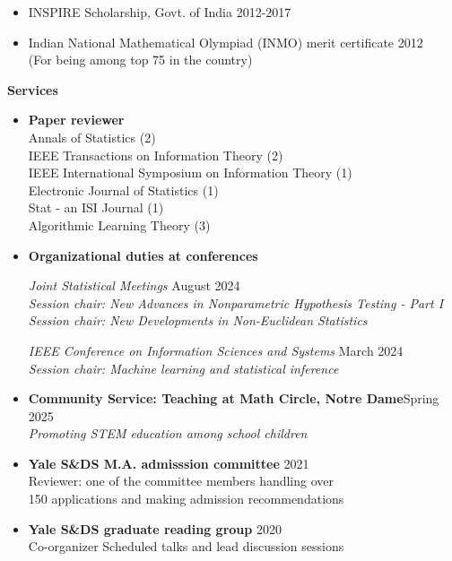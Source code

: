 \documentclass[letterpaper,12pt,oneside]{article}
\theoremstyle{definition}
\begin{document}
			\begin{itemize}
				\item [] INSPIRE Scholarship, Govt. of India \hfill 2012-2017
				\item [] Indian National Mathematical Olympiad (INMO) merit certificate \hfill 2012\\
				(For being among top 75 in the country)
			\end{itemize}
			
			
			\noindent \textbf{Services}
			\begin{itemize}
				\item[]
				{\bf Paper reviewer}\\
				Annals of Statistics (2)\\
				IEEE Transactions on Information Theory (2)\\
				IEEE International Symposium on Information Theory (1)\\
				Electronic Journal of Statistics (1)\\
				Stat - an ISI Journal (1)\\
				Algorithmic Learning Theory (3)
				\item[] 
				{\bf Organizational duties at conferences}
				
				{\it Joint Statistical Meetings} \hfill August 2024\\
				{\it Session chair: New Advances in Nonparametric Hypothesis Testing - Part I}\\
				{\it Session chair: New Developments in Non-Euclidean Statistics}
				
				{\it IEEE Conference on Information Sciences and Systems} \hfill March 2024\\
				{\it  Session chair: Machine learning and statistical inference}
				
				\item[] \textbf{Community Service: Teaching at Math Circle, Notre Dame}\hfill Spring 2025\\
				{\it Promoting STEM education among school children}
				
				
				\item[] {\bf Yale S\&DS M.A. admisssion committee} \hfill 2021\\
				Reviewer: one of the committee members
				handling over\\ 150 applications
				and making admission recommendations
				
				\item[] {\bf Yale S\&DS graduate reading group} \hfill 2020\\
				Co-organizer
				Scheduled talks and lead discussion sessions
				

\end{itemize}
\end{document}

